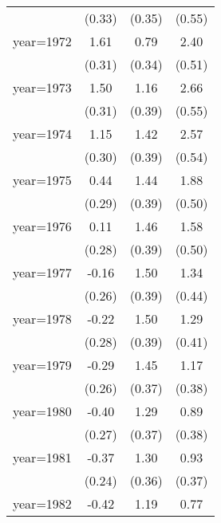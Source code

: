 \begin{sidewaystable}[htbp]
\begin{tabular}{l*{3}{c}}
                &   (0.33)         &   (0.35)         &   (0.55)         \\
\addlinespace
year=1972       &     1.61\sym{***}&     0.79\sym{**} &     2.40\sym{***}\\
                &   (0.31)         &   (0.34)         &   (0.51)         \\
\addlinespace
year=1973       &     1.50\sym{***}&     1.16\sym{***}&     2.66\sym{***}\\
                &   (0.31)         &   (0.39)         &   (0.55)         \\
\addlinespace
year=1974       &     1.15\sym{***}&     1.42\sym{***}&     2.57\sym{***}\\
                &   (0.30)         &   (0.39)         &   (0.54)         \\
\addlinespace
year=1975       &     0.44         &     1.44\sym{***}&     1.88\sym{***}\\
                &   (0.29)         &   (0.39)         &   (0.50)         \\
\addlinespace
year=1976       &     0.11         &     1.46\sym{***}&     1.58\sym{***}\\
                &   (0.28)         &   (0.39)         &   (0.50)         \\
\addlinespace
year=1977       &    -0.16         &     1.50\sym{***}&     1.34\sym{***}\\
                &   (0.26)         &   (0.39)         &   (0.44)         \\
\addlinespace
year=1978       &    -0.22         &     1.50\sym{***}&     1.29\sym{***}\\
                &   (0.28)         &   (0.39)         &   (0.41)         \\
\addlinespace
year=1979       &    -0.29         &     1.45\sym{***}&     1.17\sym{***}\\
                &   (0.26)         &   (0.37)         &   (0.38)         \\
\addlinespace
year=1980       &    -0.40         &     1.29\sym{***}&     0.89\sym{**} \\
                &   (0.27)         &   (0.37)         &   (0.38)         \\
\addlinespace
year=1981       &    -0.37         &     1.30\sym{***}&     0.93\sym{**} \\
                &   (0.24)         &   (0.36)         &   (0.37)         \\
\addlinespace
year=1982       &    -0.42\sym{*}  &     1.19\sym{***}&     0.77\sym{*}  \\

\end{tabular}
\end{sidewaystable}
